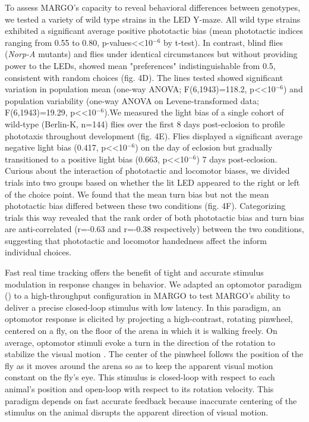 \documentclass[10pt]{article}
\begin{document}
\begin{multicols}{2}
To assess MARGO's capacity to reveal behavioral differences between genotypes, we tested a variety of wild type strains in the LED Y-maze. All wild type strains exhibited a significant average positive phototactic bias (mean phototactic indices ranging from 0.55 to 0.80, p-values<<10$^{-6}$ by t-test). In contrast, blind flies (\emph{Norp-A} mutants) and flies under identical circumstances but without providing power to the LEDs, showed mean "preferences" indistinguishable from 0.5, consistent with random choices (fig. 4D). The lines tested showed significant variation in population mean (one-way ANOVA; F(6,1943)=118.2, p<<10$^{-6}$) and population variability (one-way ANOVA on Levene-transformed data; F(6,1943)=19.29, p<<10$^{-6}$).We measured the light bias of a single cohort of wild-type (Berlin-K, n=144) flies over the first 8 days post-eclosion to profile phototaxis throughout development (fig. 4E). Flies displayed a significant average negative light bias (0.417, p<<10$^{-6}$) on the day of eclosion but gradually transitioned to a positive light bias (0.663, p<<10$^{-6}$) 7 days post-eclosion. Curious about the interaction of phototactic and locomotor biases, we divided trials into two groups based on whether the lit LED appeared to the right or left of the choice point. We found that the mean turn bias but not the mean phototactic bias differed between these two conditions (fig. 4F). Categorizing trials this way revealed that the rank order of both phototactic bias and turn bias are anti-correlated (r=-0.63 and r=-0.38 respectively) between the two conditions, suggesting that phototactic and locomotor handedness affect the inform individual choices. 

Fast real time tracking offers the benefit of tight and accurate stimulus modulation in response changes in behavior. We adapted an optomotor paradigm (\cite{Cruz572792})  to a high-throughput configuration in MARGO  to test MARGO's ability to deliver a precise closed-loop stimulus with low latency. In this paradigm, an optomotor response is elicited by projecting a high-contrast, rotating pinwheel, centered on a fly, on the floor of the arena in which it is walking freely. On average, optomotor stimuli evoke a turn in the direction of the rotation to stabilize the visual motion \cite{Gtz_Visual_1973}. The center of the pinwheel follows the position of the fly as it moves around the arena so as to keep the apparent visual motion constant on the fly's eye. This stimulus is closed-loop with respect to each animal's position and open-loop with respect to its rotation velocity. This paradigm depends on fast accurate feedback because inaccurate centering of the stimulus on the animal disrupts the apparent direction of visual motion.


\end{multicols}
\end{document}
